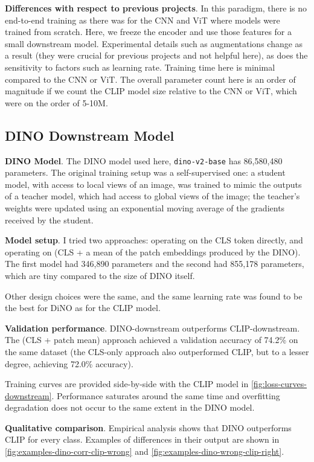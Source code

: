 \documentclass[11pt]{article}
\begin{document}
\textbf{Differences with respect to previous projects}. In this paradigm, there is no end-to-end training as there was for the CNN and ViT where models were trained from scratch. Here, we freeze the encoder and use those features for a small downstream model. Experimental details such as augmentations change as a result (they were crucial for previous projects and not helpful here), as does the sensitivity to factors such as learning rate. Training time here is minimal compared to the CNN or ViT. The overall parameter count here is an order of magnitude if we count the CLIP model size relative to the CNN or ViT, which were on the order of 5-10M. 

\subsection{DINO Downstream Model}

\textbf{DINO Model}. The DINO model used here, \texttt{dino-v2-base} has 86,580,480 parameters. The original training setup \cite{caron2021emerging} was a self-supervised one: a student model, with access to local views of an image, was trained to mimic the outputs of a teacher model, which had access to global views of the image; the teacher's weights were updated using an exponential moving average of the gradients received by the student. 

\textbf{Model setup}. I tried two approaches: operating on the CLS token directly, and operating on (CLS + a mean of the patch embeddings produced by the DINO). The first model had 346,890 parameters and the second had 855,178 parameters, which are tiny compared to the size of DINO itself. 

Other design choices were the same, and the same learning rate was found to be the best for DiNO as for the CLIP model.

\textbf{Validation performance}. DINO-downstream outperforms CLIP-downstream. The (CLS + patch mean) approach achieved a validation accuracy of 74.2\% on the same dataset (the CLS-only approach also outperformed CLIP, but to a lesser degree, achieving 72.0\% accuracy). 

Training curves are provided side-by-side with the CLIP model in \autoref{fig:loss-curves-downstream}. Performance saturates around the same time and overfitting degradation does not occur to the same extent in the DINO model.

\textbf{Qualitative comparison}. Empirical analysis shows that DINO outperforms CLIP for every class. Examples of differences in their output are shown in \autoref{fig:examples-dino-corr-clip-wrong} and \autoref{fig:examples-dino-wrong-clip-right}.
\end{document}
